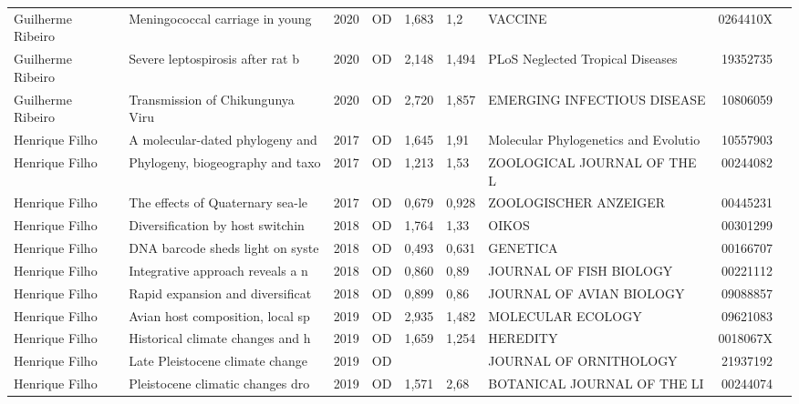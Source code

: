 \documentclass[12pt,brazil]{article}\usepackage[]{graphicx}\usepackage[]{xcolor}
\begin{document}
\begin{longtable}{lllrrllrr}
Guilherme Ribeiro & Meningococcal carriage in young  & 2020 & OD & 1,683 & 1,2 & VACCINE & 0264410X \\
Guilherme Ribeiro & Severe leptospirosis after rat b & 2020 & OD & 2,148 & 1,494 & PLoS Neglected Tropical Diseases & 19352735 \\
Guilherme Ribeiro & Transmission of Chikungunya Viru & 2020 & OD & 2,720 & 1,857 & EMERGING INFECTIOUS DISEASE & 10806059 \\
\rowcolor{coautr}\rowcolor{coautr}\rowcolor{coautr}\rowcolor{coautr}\rowcolor{coautr}\rowcolor{coautr}\rowcolor{coautr}\rowcolor{coautr}\rowcolor{coautr}\rowcolor{coautr}\rowcolor{coautr}\rowcolor{coautr}\rowcolor{coautr}\rowcolor{coautr}\rowcolor{coautr}\rowcolor{coautr}Henrique Filho & A molecular-dated phylogeny and  & 2017 & OD & 1,645 & 1,91 & Molecular Phylogenetics and Evolutio & 10557903 \\
Henrique Filho & Phylogeny, biogeography and taxo & 2017 & OD & 1,213 & 1,53 & ZOOLOGICAL JOURNAL OF THE L & 00244082 \\
Henrique Filho & The effects of Quaternary sea-le & 2017 & OD & 0,679 & 0,928 & ZOOLOGISCHER ANZEIGER & 00445231 \\
Henrique Filho & Diversification by host switchin & 2018 & OD & 1,764 & 1,33 & OIKOS & 00301299 \\
Henrique Filho & DNA barcode sheds light on syste & 2018 & OD & 0,493 & 0,631 & GENETICA & 00166707 \\
Henrique Filho & Integrative approach reveals a n & 2018 & OD & 0,860 & 0,89 & JOURNAL OF FISH BIOLOGY & 00221112 \\
Henrique Filho & Rapid expansion and diversificat & 2018 & OD & 0,899 & 0,86 & JOURNAL OF AVIAN BIOLOGY & 09088857 \\
Henrique Filho & Avian host composition, local sp & 2019 & OD & 2,935 & 1,482 & MOLECULAR ECOLOGY & 09621083 \\
Henrique Filho & Historical climate changes and h & 2019 & OD & 1,659 & 1,254 & HEREDITY & 0018067X \\
Henrique Filho & Late Pleistocene climate change  & 2019 & OD &  &  & JOURNAL OF ORNITHOLOGY & 21937192 \\
\rowcolor{coautr}\rowcolor{coautr}\rowcolor{coautr}\rowcolor{coautr}\rowcolor{coautr}\rowcolor{coautr}\rowcolor{coautr}\rowcolor{coautr}\rowcolor{coautr}\rowcolor{coautr}\rowcolor{coautr}\rowcolor{coautr}\rowcolor{coautr}\rowcolor{coautr}\rowcolor{coautr}\rowcolor{coautr}Henrique Filho & Pleistocene climatic changes dro & 2019 & OD & 1,571 & 2,68 & BOTANICAL JOURNAL OF THE LI & 00244074 \\

\end{longtable}
\end{document}
